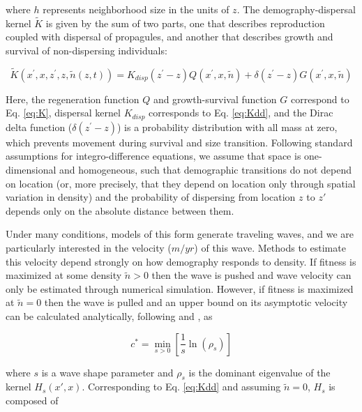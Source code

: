 \documentclass[11pt]{article}\usepackage[]{graphicx}\usepackage[]{color}
\begin{document}
where $h$ represents neighborhood size in the units of $z$.
The demography-dispersal kernel $\tilde{K}$ is given by the sum of two parts, one that describes reproduction coupled with dispersal of propagules, and another that describes growth and survival of non-dispersing individuals:

\begin{linenomath*} 
\begin{equation} \label{eq:Kdd}
\tilde{K}(x^\prime,x,z^\prime,z,\tilde{n}(z,t)) = K_{disp}(z^\prime-z)Q(x^\prime,x,\tilde{n}) + \delta(z^\prime-z)G(x^\prime,x,\tilde{n})
\end{equation} 
\end{linenomath*}

Here, the regeneration function $Q$ and growth-survival function $G$ correspond to Eq. \ref{eq:K}, dispersal kernel $K_{disp}$ corresponds to Eq. \ref{eq:Kdd}, and the Dirac delta function ($\delta(z^\prime-z)$) is a probability distribution with all mass at zero, which prevents movement during survival and size transition. 
Following standard assumptions for integro-difference equations, we assume that space is one-dimensional and homogeneous, such that demographic transitions do not depend on location (or, more precisely, that they depend on location only through spatial variation in density) and the probability of dispersing from location $z$ to $z\prime$ depends only on the absolute distance between them.

Under many conditions, models of this form generate traveling waves, and we are particularly interested in the velocity ($m/yr$) of this wave.
Methods to estimate this velocity depend strongly on how demography responds to density. 
If fitness is maximized at some density $\tilde{n}>0$ then the wave is pushed and wave velocity can only be estimated through numerical simulation. 
However, if fitness is maximized at $\tilde{n}=0$ then the wave is pulled and an upper bound on its asymptotic velocity can be calculated analytically, following \cite{neubert2000demography} and \cite{jongejans2011importance}, as

\begin{linenomath*} 
\begin{equation} 
c^* = \min_{s > 0} \left[\frac{1}{s}\ln(\rho_{s})\right] 
\end{equation} 
\end{linenomath*} 

where $s$ is a wave shape parameter and $\rho_{s}$ is the dominant eigenvalue of the kernel $H_{s}(x\prime,x)$.
Corresponding to Eq. \ref{eq:Kdd} and assuming $\tilde{n}=0$, $H_{s}$ is composed of
\end{document}
